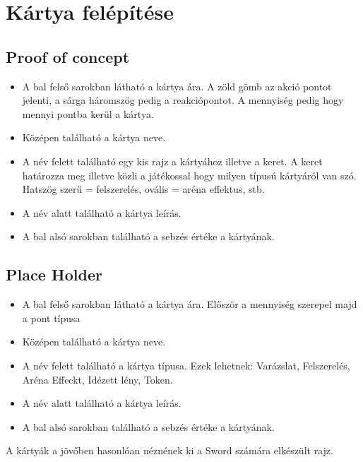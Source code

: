 \section{Kártya felépítése}
\subsection{Proof of concept}
\begin{itemize}
    \item A bal felső sarokban látható a kártya ára. A zöld gömb az akció pontot jelenti, a sárga háromszög pedig a reakciópontot. A mennyiség pedig hogy mennyi pontba kerül a kártya.
    \item Középen található a kártya neve.
    \item A név felett található egy kis rajz a kártyához illetve a keret. A keret határozza meg illetve közli a játékossal hogy milyen típusú kártyáról van szó. Hatszög szerű = felszerelés, ovális = aréna effektus, stb.
    \item A név alatt található a kártya leírás.
    \item A bal alsó sarokban található a sebzés értéke a kártyának.
\end{itemize}

\subsection{Place Holder}
\begin{itemize}
    \item A bal felső sarokban látható a kártya ára. Először a mennyiség szerepel majd a pont típusa
    \item Középen található a kártya neve.
    \item A név felett található a kártya típusa. Ezek lehetnek: Varázslat, Felszerelés, Aréna Effeckt, Idézett lény, Token.
    \item A név alatt található a kártya leírás.
    \item A bal alsó sarokban található a sebzés értéke a kártyának.
\end{itemize}

A kártyák a jövőben hasonlóan néznének ki a Sword számára elkészült rajz.

